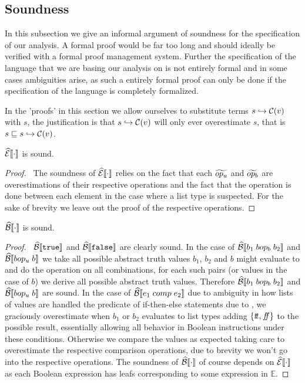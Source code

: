 \subsection{Soundness}\label{subsec:soundness}

In this subsection we give an informal argument of soundness for the specification of our analysis.
A formal proof would be far too long and should ideally be verified with a formal proof management system.
Further the specification of the language that we are basing our analysis on \cite{halder_abstract_2012} is not entirely formal and in some cases ambiguities arise, as such a entirely formal proof can only be done if the specification of the language is completely formalized.

In the 'proofs' in this section we allow ourselves to substitute terms $s \hookrightarrow \mathcal{C}(v)$ with $s$, the justification is that $s \hookrightarrow \mathcal{C}(v)$ will only ever overestimate $s$, that is $s \sqsubseteq s \hookrightarrow \mathcal{C}(v)$.

\begin{conjecture}\label{thm:sound-exp}
    $\widehat{\mathcal{E}}\llbracket \cdot \rrbracket$ is sound.
\end{conjecture}
\begin{proof}
    \pfsketch\
    The soundness of $\widehat{\mathcal{E}}\llbracket \cdot \rrbracket$ relies on the fact that each $\widetilde{op_u}$ and $\widetilde{op_b}$ are overestimations of their respective operations and the fact that the operation is done between each element in the case where a list type is suspected.
    For the sake of brevity we leave out the proof of the respective operations.
\end{proof}

\begin{conjecture}\label{thm:sound-bool}
    $\widehat{\mathcal{B}}\llbracket \cdot \rrbracket$ is sound.
\end{conjecture}
\begin{proof}
    \pfsketch\
    $\widehat{\mathcal{B}}\llbracket \texttt{true} \rrbracket$ and $\widehat{\mathcal{B}}\llbracket \texttt{false} \rrbracket$ are clearly sound.
    In the case of $\widehat{\mathcal{B}}\llbracket b_1 \; bop_b \; b_2 \rrbracket$ and $\widehat{\mathcal{B}}\llbracket bop_u \; b \rrbracket$ we take all possible abstract truth values $b_1$, $b_2$ and $b$ might evaluate to and do the operation on all combinations, for each such pairs (or values in the case of $b$) we derive all possible abstract truth values.
    Therefore $\widehat{\mathcal{B}}\llbracket b_1 \; bop_b \; b_2 \rrbracket$ and $\widehat{\mathcal{B}}\llbracket bop_u \; b \rrbracket$ are sound.
    In the case of $\widehat{\mathcal{B}}\llbracket e_1 \; comp \; e_2 \rrbracket$ due to ambiguity in how lists of values are handled the predicate of if-then-else statements due to \cite{halder_abstract_2012}, we graciously overestimate when $b_1$ or $b_2$ evaluates to list types adding $\{t\!t, f\!\!f\}$ to the possible result, essentially allowing all behavior in Boolean instructions under these conditions.
    Otherwise we compare the values as expected taking care to overestimate the respective comparison operations, due to brevity we won't go into the respective operations.
    The soundness of $\widehat{\mathcal{B}}\llbracket \cdot \rrbracket$ of course depends on $\widehat{\mathcal{E}}\llbracket \cdot \rrbracket$ as each Boolean expression has leafs corresponding to some expression in $\mathbb{E}$.
\end{proof}

